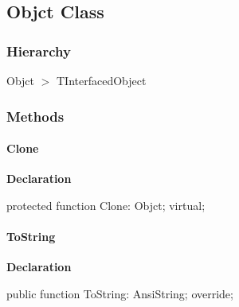 \documentclass{report}
\newif\ifpdf
\begin{document}
\subsection*{Objct Class}
\fi
\label{NewPascal.Base.Objct}
\subsubsection*{\large{\textbf{Hierarchy}}\normalsize\hspace{1ex}\hfill}
Objct {$>$} TInterfacedObject
\subsubsection*{\large{\textbf{Methods}}\normalsize\hspace{1ex}\hfill}
\paragraph*{Clone}\hspace*{\fill}

\label{NewPascal.Base.Objct-Clone}
\begin{list}{}{
\setlength{\itemindent}{0cm}
\setlength{\listparindent}{0cm}
\setlength{\leftmargin}{\evensidemargin}
\addtolength{\leftmargin}{\tmplength}
\settowidth{\labelsep}{X}
\addtolength{\leftmargin}{\labelsep}
\setlength{\labelwidth}{\tmplength}
}
\item[\textbf{Declaration}\hfill]
\ifpdf
\begin{flushleft}
\fi
\begin{ttfamily}
protected function Clone: Objct; virtual;\end{ttfamily}

\ifpdf
\end{flushleft}
\fi

\end{list}
\paragraph*{ToString}\hspace*{\fill}

\label{NewPascal.Base.Objct-ToString}
\begin{list}{}{
\setlength{\itemindent}{0cm}
\setlength{\listparindent}{0cm}
\setlength{\leftmargin}{\evensidemargin}
\addtolength{\leftmargin}{\tmplength}
\settowidth{\labelsep}{X}
\addtolength{\leftmargin}{\labelsep}
\setlength{\labelwidth}{\tmplength}
}
\item[\textbf{Declaration}\hfill]
\ifpdf
\begin{flushleft}
\fi
\begin{ttfamily}
public function ToString: AnsiString; override;\end{ttfamily}

\ifpdf
\end{flushleft}
\fi

\end{list}
\ifpdf
\end{document}
